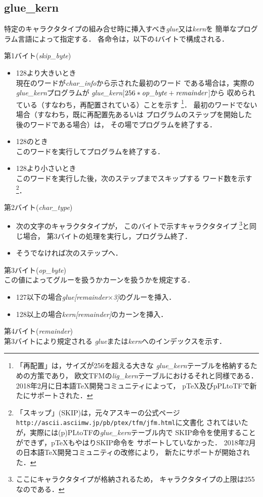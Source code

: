 \documentclass[a4paper,11pt,nomag]{jsarticle}
\begin{document}
\subsection{glue\_kern}
特定のキャラクタタイプの組み合せ時に挿入すべき{\it glue}又は{\it kern}を
簡単なプログラム言語によって指定する．
各命令は，以下の4バイトで構成される．
\begin{description}
\item{第1バイト({\it skip\_byte})}
	\begin{itemize}
	\item 128より大きいとき\\
		現在のワードが{\it char\_info}から示された最初のワード
		である場合は，実際の{\it glue\_kern}プログラムが
		{\it glue\_kern}[$256*{\it op\_byte}+{\it remainder}$]から
		収められている（すなわち，再配置されている）ことを示す
		\footnote{「再配置」は，サイズが256を超える大きな
		{\it glue\_kern}テーブルを格納するための方策であり，
		欧文TFMの{\it lig\_kern}テーブルにおけるそれと同様である．
		2018年2月に日本語\TeX{}開発コミュニティによって，
		p\TeX{}及びpPLtoTFで新たにサポートされた．}．
		最初のワードでない場合（すなわち，既に再配置先あるいは
		プログラムのステップを開始した後のワードである場合）は，
		その場でプログラムを終了する．
	\item 128のとき\\
		このワードを実行してプログラムを終了する．
	\item 128より小さいとき\\
		このワードを実行した後，次のステップまでスキップする
		ワード数を示す
		\footnote{「スキップ」(SKIP)は，元々アスキーの公式ページ
		{\tt http://ascii.asciimw.jp/pb/ptex/tfm/jfm.html}に文書化
		されてはいたが，実際には(p)PLtoTFの{\it glue\_kern}テーブル内で
		SKIP命令を使用することができず，p\TeX{}もやはりSKIP命令を
		サポートしていなかった．
		2018年2月の日本語\TeX{}開発コミュニティの改修により，
		新たにサポートが開始された．}．
	\end{itemize}
\item{第2バイト({\it char\_type})}
	\begin{itemize}
	\item 次の文字のキャラクタタイプが，
		このバイトで示すキャラクタタイプ
		\footnote{ここにキャラクタタイプが格納されるため，
		キャラクタタイプの上限は255なのである．}と同じ場合，
		第3バイトの処理を実行し，プログラム終了．
	\item そうでなければ次のステップへ．
	\end{itemize}
\item{第3バイト({\it op\_byte})}\\
	この値によってグルーを扱うかカーンを扱うかを規定する．
	\begin{itemize}
	\item 127以下の場合{\it glue[remainder$\times$3]}のグルーを挿入．
	\item 128以上の場合{\it kern[remainder]}のカーンを挿入．
	\end{itemize}
\item{第4バイト({\it remainder})}\\
	第3バイトにより規定される
	{\it glue}または{\it kern}へのインデックスを示す．
\end{description}
%
\end{document}
